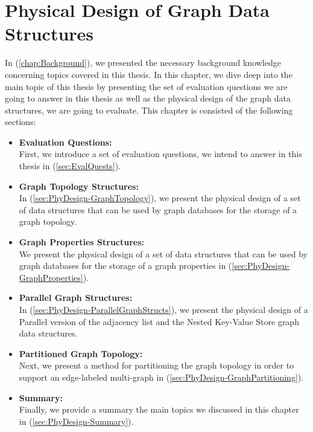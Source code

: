 {\chapter{Physical Design of Graph Data Structures}
\label{chap:PhysicalDesign}

In (\ref{chap:Background}),  we  presented  the  necessary  background  knowledge  concerning  topics covered in this thesis.  In this chapter, we dive deep into the main topic of this thesis by presenting the set of evaluation questions we are going to answer in this thesis as well as the physical design of the graph data structures, we are going to evaluate. This chapter is consisted of the following sections:
\begin{itemize}  
\item \textbf{Evaluation Questions:}\\
First, we introduce a set of evaluation questions, we intend to answer in this thesis in (\ref{sec:EvalQuests}).

\item\textbf{Graph Topology Structures:}\\
In (\ref{sec:PhyDesign-GraphTopology}), we present the physical design of a set of data structures that can be used by graph databases for the storage of a graph topology.

\item\textbf{Graph Properties Structures:}\\
We present the physical design of a set of data structures that can be used by graph databases for the storage of a graph properties in (\ref{sec:PhyDesign-GraphProperties}).

\item\textbf{Parallel Graph Structures:}\\
In (\ref{sec:PhyDesign-ParallelGraphStructs}), we present the physical design of a Parallel version of the adjacency list and the Nested Key-Value Store graph data structures.

\item\textbf{Partitioned Graph Topology:}\\
Next, we present a method for partitioning the graph topology in order to support an edge-labeled multi-graph in (\ref{sec:PhyDesign-GraphPartitioning}).

\item \textbf{Summary:}\\
Finally, we provide a summary the main topics we discussed in this chapter in (\ref{sec:PhyDesign-Summary}).
\end{itemize}



}
